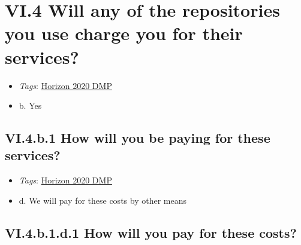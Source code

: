\documentclass[a4paper,12pt]{report}
\begin{document}
\section*{\protect\textcolor{colorSecId}{VI.4} Will any of the repositories you use charge you for their services?}

\label{d5b27482-b598-4b8c-b534-417d4ad27394.de23bb94-b727-4907-9a5d-6f8c78c3e432}


\begin{itemize}
  \item \textit{Tags}: \ul{Horizon 2020 DMP}
  \end{itemize}




\begin{itemize}
  \item[\CheckmarkBold] b. Yes
\end{itemize}




\subsection*{\protect\textcolor{colorSecId}{VI.4.b.1} How will you be paying for these services?}

\label{d5b27482-b598-4b8c-b534-417d4ad27394.de23bb94-b727-4907-9a5d-6f8c78c3e432.fe8ed36b-40e8-483b-ab31-061f6168d7ad.edc9b6d9-c121-4e00-ba83-710330c2e18d}


\begin{itemize}
  \item \textit{Tags}: \ul{Horizon 2020 DMP}
  \end{itemize}




\begin{itemize}
  \item[\CheckmarkBold] d. We will pay for these costs by other means
\end{itemize}




\subsection*{\protect\textcolor{colorSecId}{VI.4.b.1.d.1} How will you pay for these costs?}
\end{document}

